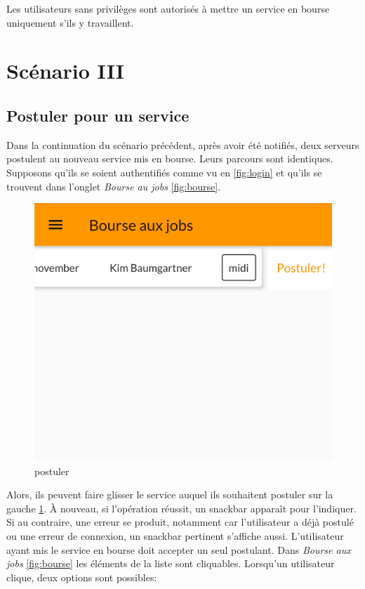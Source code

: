 Les utilisateurs sans privilèges sont autorisés à mettre un service en bourse uniquement s'ils y travaillent.

\section[Postuler pour un service - Scénario III]{Scénario III}
    \subsection*{Postuler pour un service}
    Dans la continuation du scénario précédent, après avoir été notifiés,
    deux serveurs postulent au nouveau service mis
    en bourse. Leurs parcours sont identiques.
    Supposons qu'ils se soient authentifiés comme vu en \ref{fig:login} et qu'ils se trouvent
    dans l'onglet \textit{Bourse au jobs} \ref{fig:bourse}.
    \vfill
    \begin{figure}[h]
        \centering
        \includegraphics[width=.3\linewidth]{screenshots/scenario_03/postuler.png}
        \caption{postuler}
        \label{fig:postuler}
    \end{figure}
    \vfill
    Alors, ils peuvent faire glisser le service auquel ils souhaitent postuler sur
    la gauche \ref{fig:postuler}. À nouveau, si l'opération réussit, un snackbar apparaît pour l'indiquer. Si au contraire, une
    erreur se produit, notamment car l'utilisateur a déjà postulé ou une erreur de connexion, un snackbar pertinent s'affiche aussi.
    \newpage
    L'utilisateur ayant mis le service en bourse doit accepter un seul postulant. Dans \textit{Bourse aux jobs} \ref{fig:bourse} les éléments de 
    la liste sont cliquables. Lorsqu'un utilisateur clique, deux options sont possibles:
    \smallskip
